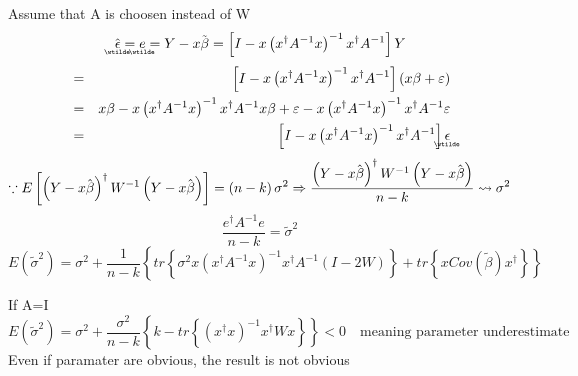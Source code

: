 \documentclass{article}
\begin{document}
Assume that A is choosen instead of W%
\begin{equation*}
\underaccent{\wtilde}{\hat{\epsilon}}%
=%
\underaccent{\wtilde}{e}%
=Y-x\tilde{\beta}=\left[ I-x\left( x^{\dagger }A^{-1}x\right)
^{-1}x^{\dagger }A^{-1}\right] Y
\end{equation*}%
\begin{eqnarray*}
&=&\left[ I-x\left( x^{\dagger }A^{-1}x\right) ^{-1}x^{\dagger }A^{-1}\right]
\left( x\beta +\varepsilon \right)  \\
&=&x\beta -x\left( x^{\dagger }A^{-1}x\right) ^{-1}x^{\dagger }A^{-1}x\beta
+\varepsilon -x\left( x^{\dagger }A^{-1}x\right) ^{-1}x^{\dagger
}A^{-1}\varepsilon  \\
&=&\left[ I-x\left( x^{\dagger }A^{-1}x\right) ^{-1}x^{\dagger }A^{-1}\right]
\underaccent{\wtilde}{\epsilon}%
\end{eqnarray*}%
\begin{equation*}
\because E\left[ \left( Y-x\hat{\beta}\right) ^{\dagger }W^{-1}\left( Y-x%
\hat{\beta}\right) \right] =\left( n-k\right) \sigma ^{2}\Rightarrow \frac{%
\left( Y-x\hat{\beta}\right) ^{\dagger }W^{-1}\left( Y-x\hat{\beta}\right) }{%
n-k}\leadsto \sigma ^{2}
\end{equation*}%
\begin{equation*}
\frac{e^{\dagger }A^{-1}e}{n-k}=\tilde{\sigma}^{2}
\end{equation*}%
\begin{equation*}
E\left( \tilde{\sigma}^{2}\right) =\sigma ^{2}+\frac{1}{n-k}\left\{
tr\left\{ \sigma ^{2}x\left( x^{\dagger }A^{-1}x\right) ^{-1}x^{\dagger
}A^{-1}\left( I-2W\right) \right\} +tr\left\{ xCov\left( \tilde{\beta}%
\right) x^{\dagger }\right\} \right\} 
\end{equation*}

If A=I%
\begin{equation*}
E\left( \tilde{\sigma}^{2}\right) =\sigma ^{2}+\frac{\sigma ^{2}}{n-k}%
\left\{ k-tr\left\{ \left( x^{\dagger }x\right) ^{-1}x^{\dagger }Wx\right\}
\right\} <0\quad \text{meaning parameter underestimate}
\end{equation*}%
Even if paramater are obvious, the result is not obvious
\end{document}
